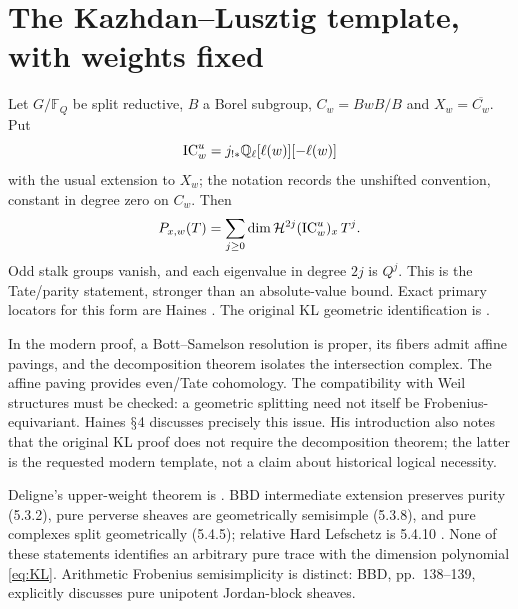 \documentclass[11pt,a4paper]{article}
\newcommand{\Q}{\mathbb Q}\newcommand{\Z}{\mathbb Z}\newcommand{\C}{\mathbb C}\newcommand{\N}{\mathbb N}\newcommand{\F}{\mathbb F}
\renewcommand{\S}{\ensuremath{\mathsection}}
\theoremstyle{named}\newtheorem{finding}{Finding}[section]
\theoremstyle{definition}\newtheorem{definition}[finding]{Definition}
\theoremstyle{remark}\newtheorem{remark}[finding]{Remark}
\begin{document}
\section{The Kazhdan--Lusztig template, with weights fixed}\label{sec:KL}
Let $G/\F_Q$ be split reductive, $B$ a Borel subgroup, $C_w=BwB/B$ and $X_w=\overline{C_w}$. Put
\[
 \IC_w^u=j_{!*}\Q_\ell[\ell(w)][-\ell(w)]
\]
with the usual extension to $X_w$; the notation records the unshifted convention, constant in degree zero on $C_w$. Then
\begin{equation}\label{eq:KL}
 P_{x,w}(T)=\sum_{j\ge0}\dim\mathcal H^{2j}(\operatorname{IC}_w^u)_x\,T^j.
\end{equation}
Odd stalk groups vanish, and each eigenvalue in degree $2j$ is $Q^j$. This is the Tate/parity statement, stronger than an absolute-value bound. Exact primary locators for this form are Haines \cite[Theorems 2.0.1, 5.0.4; Proposition 3.0.2; \S4]{Haines}. The original KL geometric identification is \cite[Theorem 4.3]{KL}.

In the modern proof, a Bott--Samelson resolution is proper, its fibers admit affine pavings, and the decomposition theorem isolates the intersection complex. The affine paving provides even/Tate cohomology. The compatibility with Weil structures must be checked: a geometric splitting need not itself be Frobenius-equivariant. Haines \S4 discusses precisely this issue. His introduction also notes that the original KL proof does not require the decomposition theorem; the latter is the requested modern template, not a claim about historical logical necessity.

Deligne's upper-weight theorem is \cite[Theorem 3.3.1; Corollaries 3.3.4--3.3.6]{WeilII}. BBD intermediate extension preserves purity (5.3.2), pure perverse sheaves are geometrically semisimple (5.3.8), and pure complexes split geometrically (5.4.5); relative Hard Lefschetz is 5.4.10 \cite{BBD}. None of these statements identifies an arbitrary pure trace with the dimension polynomial \eqref{eq:KL}. Arithmetic Frobenius semisimplicity is distinct: BBD, pp.~138--139, explicitly discusses pure unipotent Jordan-block sheaves.
\end{document}
